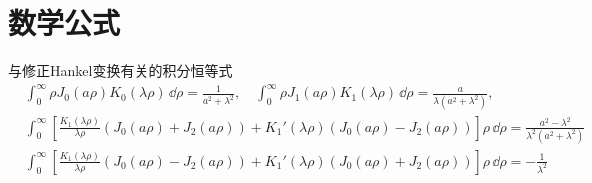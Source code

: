 \section{数学公式}
与修正Hankel变换有关的积分恒等式
\begin{align*}
	&\int_{0}^{\infty} \rho J_{0}(a\rho) K_{0}(\lambda\rho) \, \dd \rho = \frac{1}{a^{2} + \lambda^{2}}, \quad
	\int_{0}^{\infty} \rho J_{1}(a\rho) K_{1}(\lambda\rho) \, \dd \rho = \frac{a}{\lambda (a^{2} + \lambda^{2})}, \\
	&\int_{0}^{\infty} \left[ \frac{K_{1}(\lambda\rho)}{\lambda\rho} \left( J_{0}(a\rho) + J_{2}(a\rho) \right) + K_{1}'(\lambda\rho) \left( J_{0}(a\rho) - J_{2}(a\rho) \right) \right] \rho \, \dd \rho = \frac{a^{2} - \lambda^{2}}{\lambda^{2} (a^{2} + \lambda^{2})}\\
	&\int_{0}^{\infty} \left[ \frac{K_{1}(\lambda\rho)}{\lambda\rho} \left( J_{0}(a\rho) - J_{2}(a\rho) \right) + K_{1}'(\lambda\rho) \left( J_{0}(a\rho) + J_{2}(a\rho) \right) \right] \rho \, \dd \rho = -\frac{1}{\lambda^{2}}
\end{align*}

